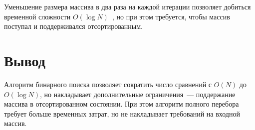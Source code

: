 Уменьшение размера массива в два раза на каждой итерации позволяет добиться временной сложности $O(\log{N})$~\cite{laaksonen2024}, но при этом требуется, чтобы массив поступал и поддерживался отсортированным.

\section{Вывод}
Алгоритм бинарного поиска позволяет сократить число сравнений с $O(N)$ до $O(\log N)$, но накладывает дополнительные ограничения~--- поддержание массива в отсортированном состоянии. При этом алгоритм полного перебора требует больше временных затрат, но не накладывает требований на входной массив.
